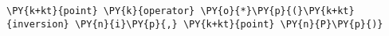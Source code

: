 \begin{Verbatim}[commandchars=\\\{\}]
    \PY{k+kt}{point} \PY{k}{operator} \PY{o}{*}\PY{p}{(}\PY{k+kt}{inversion} \PY{n}{i}\PY{p}{,} \PY{k+kt}{point} \PY{n}{P}\PY{p}{)}
\end{Verbatim}

